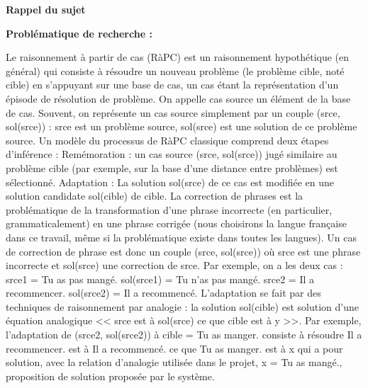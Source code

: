 \documentclass{article}
\begin{document}
\cleardoublepage

\begin{center}
{\bfseries \huge Rappel du sujet}
\end{center}

\vspace*{10mm}


{\bfseries Probl\'ematique de recherche : }
\newline
\vspace*{2mm}

Le raisonnement \`{a} partir de cas (R\`{a}PC) est un raisonnement hypoth\'etique (en g\'en\'eral) qui consiste \`{a} r\'esoudre un nouveau probl\`{e}me (le probl\`{e}me cible, not\'e cible) en s'appuyant sur une base de cas, un cas \'etant la repr\'esentation d'un \'episode de r\'esolution de probl\`{e}me. On appelle cas source un \'el\'ement de la base de cas. Souvent, on repr\'esente un cas source simplement par un couple (srce, sol(srce)) : srce est un probl\`{e}me source, sol(srce) est une solution de ce probl\`{e}me source. Un mod\`{e}le du processus de R\`{a}PC classique comprend deux \'etapes d'inf\'erence : 
\newline
Rem\'emoration : un cas source (srce, sol(srce)) jug\'e similaire au probl\`{e}me cible (par exemple, sur la base d'une distance entre probl\`{e}mes) est s\'electionn\'e. 
\newline
Adaptation : La solution sol(srce) de ce cas est modifi\'ee en une solution candidate sol(cible) de cible. 
\newline
La correction de phrases est la probl\'ematique de la transformation d'une phrase incorrecte (en particulier, grammaticalement) en une phrase corrig\'ee (nous choisirons la langue fran\c{c}aise dans ce travail, m\^eme si la probl\'ematique existe dans toutes les langues). Un cas de correction de phrase est donc un couple (srce, sol(srce)) o\`{u} srce est une phrase incorrecte et sol(srce) une correction de srce. Par exemple, on a les deux cas : 
\newline
srce1 = Tu as pas mang\'e. sol(srce1) = Tu n'as pas mang\'e. 
\newline
srce2 = Il a recommencer. sol(srce2) = Il a recommenc\'e. 
\newline
L'adaptation se fait par des techniques de raisonnement par analogie : la solution sol(cible) est solution d'une \'equation analogique << srce est \`{a} sol(srce) ce que cible est \`{a} y >>. Par exemple, l'adaptation de (srce2, sol(srce2)) \`{a} cible = Tu as manger. consiste \`{a} r\'esoudre Il a recommencer. est \`{a} Il a recommenc\'e. ce que Tu as manger. est \`{a} x qui a pour solution, avec la relation d'analogie utilis\'ee dans le projet, x = Tu as mang\'e., proposition de solution propos\'ee par le syst\`{e}me. 
\end{document}
